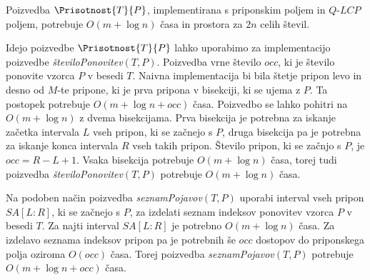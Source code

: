 \begin{izr}\label{izr:LCP}
    Poizvedba $\Prisotnost{T}{P}$, implementirana s priponskim poljem in $\textit{Q-LCP}$ poljem, potrebuje $O(m+\log{n})$ časa in prostora za $2n$ celih števil.
\end{izr}





Idejo poizvedbe $\Prisotnost{T}{P}$ lahko uporabimo za implementacijo poizvedbe \textit{številoPonovitev}$(T,P)$. Poizvedba vrne število $occ$, ki je število ponovite vzorca $P$ v besedi $T$. Naivna implementacija bi bila štetje pripon levo in desno od $M$-te pripone, ki je prva pripona v bisekciji, ki se ujema z $P$. Ta postopek potrebuje $O(m + \log{n}+occ)$ časa. Poizvedbo se lahko pohitri na $O(m + \log{n})$ z dvema bisekcijama. Prva bisekcija je potrebna za iskanje začetka intervala $L$ vseh pripon, ki se začnejo s $P$, druga bisekcija pa je potrebna za iskanje konca intervala $R$ vseh takih pripon. Število pripon, ki se začnjo s $P$, je $occ=R-L+1$. Vsaka bisekcija potrebuje $O(m+\log{n})$ časa, torej tudi poizvedba \textit{številoPonovitev}$(T,P)$ potrebuje $O(m+\log{n})$ časa.

Na podoben način poizvedba \textit{seznamPojavov}$(T,P)$ uporabi interval vseh pripon $SA[L:R]$, ki se začnejo s $P$, za izdelati seznam indeksov ponovitev vzorca $P$ v besedi $T$. Za najti interval $SA[L:R]$ je potrebno $O(m+\log{n})$ časa. Za izdelavo seznama indeksov pripon pa je potrebnih še $occ$ dostopov do priponskega polja oziroma $O(occ)$ časa. Torej poizvedba \textit{seznamPojavov}$(T,P)$ potrebuje $O(m+\log{n}+occ)$ časa.


